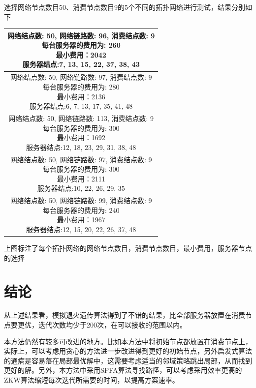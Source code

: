 \documentclass[a4paper,11pt,onecolumn,twoside]{article}
\makeatletter
\newenvironment{figurehere}
  {\def\@captype{figure}}
  {}
\makeatother
\begin{document}
\begin{multicols}{2}
选择网络节点数目50、消费节点数目9的5个不同的拓扑网络进行测试，结果分别如下
\begin{tabular}{|c|}
  \hline
  \makecell[cl]{网络结点数: 50, 网络链路数: 96, 消费结点数: 9 \\ 
  每台服务器的费用为: 260 \\ 最小费用：2042 \\ 服务器结点:7, 13, 15, 22, 37, 38, 43} \\
  \hline
  \makecell[cl]{网络结点数: 50, 网络链路数: 97, 消费结点数: 9 \\ 
  每台服务器的费用为: 280 \\ 最小费用：2136 \\ 服务器结点:6, 7, 13, 17, 35, 41, 48} \\
  \hline
  \makecell[cl]{网络结点数: 50, 网络链路数: 113, 消费结点数: 9 \\ 
  每台服务器的费用为: 300 \\ 最小费用：1692 \\ 服务器结点:12, 18, 23, 29, 31, 38, 48} \\
  \hline
  \makecell[cl]{网络结点数: 50, 网络链路数: 97, 消费结点数: 9 \\ 
  每台服务器的费用为: 300 \\ 最小费用：2111 \\ 服务器结点:10, 22, 26, 29, 35} \\
  \hline
  \makecell[cl]{网络结点数: 50, 网络链路数: 99, 消费结点数: 9 \\ 
  每台服务器的费用为: 240 \\ 最小费用：1967 \\ 服务器结点:12, 15, 20, 22, 26, 37, 48} \\
  \hline
\end{tabular}


上图标注了每个拓扑网络的网络节点数目，消费节点数目，最小费用，服务器节点的选择

\section{结论}

从上述结果看，模拟退火遗传算法得到了不错的结果，比全部服务器放置在消费节点要更优，迭代次数均少于200次，在可以接收的范围以内。

本方法仍然有较多可改进的地方。比如本方法中将初始节点都放置在消费节点上，实际上，可以考虑用贪心的方法进一步改进得到更好的初始节点，另外启发式算法的通病是容易落在局部最优解中，这需要考虑适当的邻域策略跳出局部，从而找到更好的解。另外，本方法中采用SPFA算法寻找路径，可以考虑采用效率更高的ZKW算法缩短每次迭代所需要的时间，以提高方案速率。

%
%


\end{multicols}

\clearpage
\end{document}
